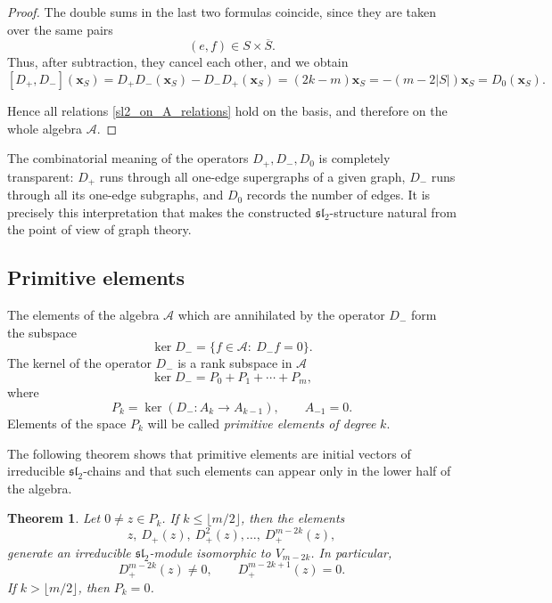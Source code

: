 \documentclass[10pt,a4paper]{amsart}
\newtheorem{theorem}{Theorem}[section]
\begin{document}
\begin{proof}
The double sums in the last two formulas coincide, since they are taken over
the same pairs
$$
(e,f)\in S\times\overline S.
$$
Thus, after subtraction, they cancel each other, and we obtain
$$
[D_+,D_-](\boldsymbol{x}_S)
=
D_+D_-(\boldsymbol{x}_S)-D_-D_+(\boldsymbol{x}_S)
=
(2k-m)\boldsymbol{x}_S
=
-(m-2 |S|)\boldsymbol{x}_S
=
D_0(\boldsymbol{x}_S).
$$

Hence all relations \eqref{sl2_on_A_relations} hold on the basis, and
therefore on the whole algebra $\mathcal A$.
\end{proof}
The combinatorial meaning of the operators $D_+,D_-,D_0$ is completely
transparent: $D_+$ runs through all one-edge supergraphs of a given graph,
$D_-$ runs through all its one-edge subgraphs, and $D_0$ records the number
of edges.
It is precisely this interpretation that makes the constructed
$\mathfrak{sl}_2$-structure natural from the point of view of graph theory.

\subsection{Primitive elements}

The elements of the algebra $\mathcal A$ which are annihilated by the operator
$D_-$ form the subspace
$$
\ker D_-=\{f\in\mathcal A:\ D_-f=0\}.
$$
The kernel of the operator $D_-$ is a rank subspace in $\mathcal A$
$$
\ker D_-= P_0+P_1+ \cdots + P_m,
$$
where
$$
P_k=\ker\left(D_-:A_k\longrightarrow A_{k-1}\right),
\qquad A_{-1}=0.
$$
Elements of the space $P_k$ will be called \emph{primitive elements of degree}
$k$.

The following theorem shows that primitive elements are initial vectors of
irreducible $\mathfrak{sl}_2$-chains and that such elements can appear only
in the lower half of the algebra.
\begin{theorem}\label{primitive_chain}
Let $0\neq z\in P_k$. If $k\le \lfloor m/2\rfloor$, then the elements
$$
z,\ D_+(z),\ D_+^2(z),\dots,\ D_+^{m-2k}(z),
$$
generate an irreducible $\mathfrak{sl}_2$-module isomorphic to $V_{m-2k}$.
In particular,
$$
D_+^{m-2k}(z)\neq 0,
\qquad
D_+^{m-2k+1}(z)=0.
$$
If $k>\lfloor m/2\rfloor$, then $P_k=0$.
\end{theorem}
\end{document}
